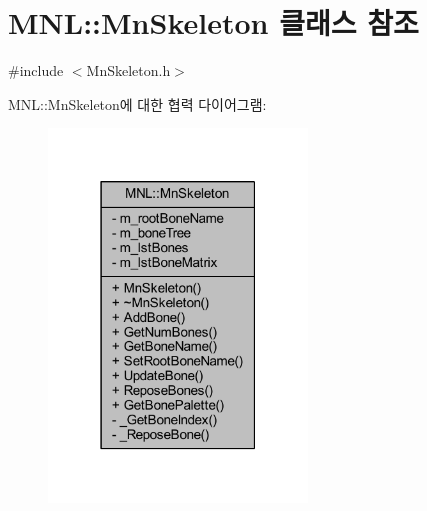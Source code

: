 \hypertarget{class_m_n_l_1_1_mn_skeleton}{}\section{M\+NL\+:\+:Mn\+Skeleton 클래스 참조}
\label{class_m_n_l_1_1_mn_skeleton}


{\ttfamily \#include $<$Mn\+Skeleton.\+h$>$}



M\+NL\+:\+:Mn\+Skeleton에 대한 협력 다이어그램\+:\nopagebreak
\begin{figure}[H]
\begin{center}
\leavevmode
\includegraphics[width=195pt]{class_m_n_l_1_1_mn_skeleton__coll__graph}
\end{center}
\end{figure}
